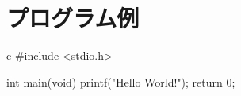\documentclass[../../main]{subfiles}
\begin{document}
\chapter{プログラム例}

\begin{codeblock}{c}
#include <stdio.h>

int main(void) {
  printf("Hello World!\n");
  return 0;
}
\end{codeblock}
\end{document}
